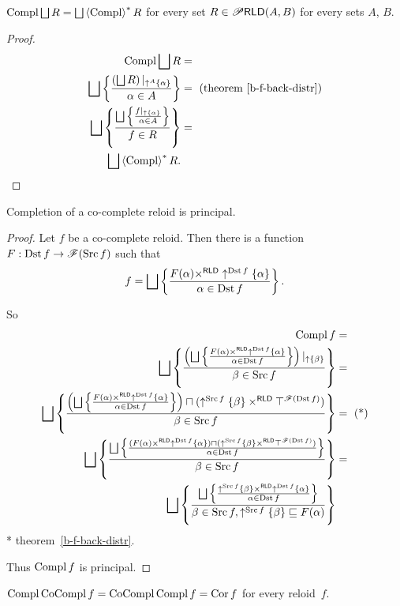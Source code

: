 \begin{thm}
$\Compl\bigsqcup R=\bigsqcup\rsupfun{\Compl}R$ for every set $R\in\mathscr{P}\mathsf{RLD}(A,B)$
for every sets $A$, $B$.\end{thm}
\begin{proof}
~
\begin{align*}
\Compl\bigsqcup R & =\\
\bigsqcup\setcond{\left(\bigsqcup R\right)|_{\uparrow^{A}\{\alpha\}}}{\alpha\in A} & =\text{ (theorem~\ref{b-f-back-distr})}\\
\bigsqcup\setcond{\bigsqcup\setcond{f|_{\uparrow \{\alpha\}}}{\alpha\in A}}{f\in R} & =\\
\bigsqcup\rsupfun{\Compl}R.
\end{align*}
\end{proof}
\begin{lem}
Completion of a co-complete reloid is principal.\end{lem}
\begin{proof}
Let $f$ be a co-complete reloid. Then there is a function $F:\operatorname{Dst} f\rightarrow\mathscr{F}(\operatorname{Src} f)$
such that
\[
f=\bigsqcup\setcond{F(\alpha)\times^{\mathsf{RLD}}\uparrow^{\Dst f}\{\alpha\}}{\alpha\in\Dst f}.
\]


So
\begin{align*}
\Compl f & =\\
\bigsqcup\setcond{\left(\bigsqcup\setcond{F(\alpha)\times^{\mathsf{RLD}}\uparrow^{\Dst f}\{\alpha\}}{\alpha\in\Dst f}\right)|_{\uparrow\{\beta\}}}{\beta\in\Src f} & =\\
\bigsqcup\setcond{\left(\bigsqcup\setcond{F(\alpha)\times^{\mathsf{RLD}}\uparrow^{\Dst f}\{\alpha\}}{\alpha\in\Dst f}\right)\sqcap(\uparrow^{\Src f}\{\beta\}\times^{\mathsf{RLD}}\top^{\mathscr{F}(\Dst f)})}{\beta\in\Src f} & =\text{ (*)}\\
\bigsqcup\setcond{\bigsqcup\setcond{(F(\alpha)\times^{\mathsf{RLD}}\uparrow^{\Dst f}\{\alpha\})\sqcap(\uparrow^{\Src f}\{\beta\}\times^{\mathsf{RLD}}\top^{\mathscr{F}(\Dst f)})}{\alpha\in\Dst f}}{\beta\in\Src f} & =\\
\bigsqcup\setcond{\bigsqcup\setcond{\uparrow^{\Src f}\{\beta\}\times^{\mathsf{RLD}}\uparrow^{\Dst f}\{\alpha\}}{\alpha\in\Dst f}}{\beta\in\Src f,\uparrow^{\Src f}\{\beta\}\sqsubseteq F(\alpha)}
\end{align*}
{*} theorem~\ref{b-f-back-distr}.

Thus $\operatorname{Compl} f$ is principal.\end{proof}
\begin{thm}
$\operatorname{Compl}\operatorname{CoCompl} f=\operatorname{CoCompl}\operatorname{Compl} f=\operatorname{Cor} f$ for every reloid~$f$.\end{thm}
